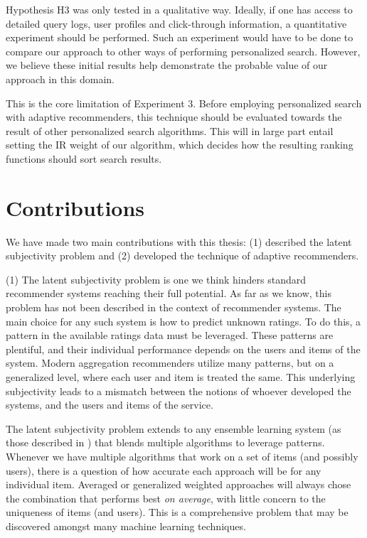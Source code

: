 Hypothesis H3 was only tested in a qualitative way.
Ideally, if one has access to detailed query logs,
user profiles and click-through information,
a quantitative experiment should be performed.
Such an experiment would have to be done
to compare our approach to other ways of performing
personalized search.
However, we believe these initial results
help demonstrate the probable value of our approach
in this domain.

This is the core limitation of Experiment 3.
Before employing personalized search with adaptive recommenders,
this technique should be evaluated towards the result
of other personalized search algorithms.
This will in large part entail setting the IR weight
of our algorithm, which decides how the resulting
ranking functions should sort search results.


\section{Contributions} 

We have made two main contributions with this thesis:
(1) described the latent subjectivity problem and
(2) developed the technique of adaptive recommenders.

(1) The latent subjectivity problem is one we think hinders
standard recommender systems reaching their full potential.
As far as we know, this problem has not been described
in the context of recommender systems.
The main choice for any such system is how to predict unknown ratings.
To do this, a pattern in the available ratings data must be leveraged.
These patterns are plentiful, and their individual performance
depends on the users and items of the system.
Modern aggregation recommenders utilize many patterns, but on a generalized
level, where each user and item is treated the same.
This underlying subjectivity leads to a mismatch between the notions
of whoever developed the systems, and the users and items of the service.

The latent subjectivity problem extends to any ensemble learning system
(as those described in \cite{Polikar2006}) that blends multiple 
algorithms to leverage patterns.
Whenever we have multiple algorithms that work on a set of items
(and possibly users), there is a question of how accurate each
approach will be for any individual item.
Averaged or generalized weighted approaches will always
chose the combination that performs best \emph{on average},
with little concern to the uniqueness of items (and users).
This is a comprehensive problem that may be discovered amongst many machine learning techniques.


